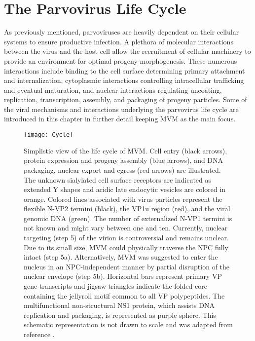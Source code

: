
\chapter{The Parvovirus Life Cycle} %

\label{Chapter7} %


As previously mentioned, parvoviruses are heavily dependent on their cellular systems to ensure productive infection. A plethora of molecular interactions between the virus and the host cell allow the recruitment of cellular machinery to provide an environment for optimal progeny morphogenesis. These numerous interactions include binding to the cell surface determining primary attachment and internalization, cytoplasmic interactions controlling intracellular trafficking and eventual maturation, and nuclear interactions regulating uncoating, replication, transcription, assembly, and packaging of progeny particles. Some of the viral mechanisms and interactions underlying the parvovirus life cycle are introduced in this chapter in further detail keeping MVM as the main focus.     


\begin{figure}[H]
\centering
  \texttt{[image: Cycle]}
  \caption[Life cycle of MVM]
   {Simplistic view of the life cycle of MVM. Cell entry (black arrows), protein expression and progeny assembly (blue arrows), and DNA packaging, nuclear export and egress (red arrows) are illustrated. The unknown sialylated cell surface receptors are indicated as extended Y shapes and acidic late endocytic vesicles are colored in orange. Colored lines associated with virus particles represent the flexible N-VP2 termini (black), the VP1u region (red), and the viral genomic DNA (green). The number of externalized N-VP1 termini is not known and might vary between one and ten. Currently, nuclear targeting (step 5) of the virion is controversial and remains unclear. Due to its small size, MVM could physically traverse the NPC fully intact (step 5a). Alternatively, MVM was suggested to enter the nucleus in an NPC-independent manner by partial disruption of the nuclear envelope (step 5b). Horizontal bars represent primary VP gene transcripts and jigsaw triangles indicate the folded core containing the jellyroll motif common to all VP polypeptides. The multifunctional non-structural NS1 protein, which assists DNA replication and packaging, is represented as purple sphere. This schematic representation is not drawn to scale and was adapted from reference \cite{small}.  
} 
\label{Cycle}
\end{figure}


